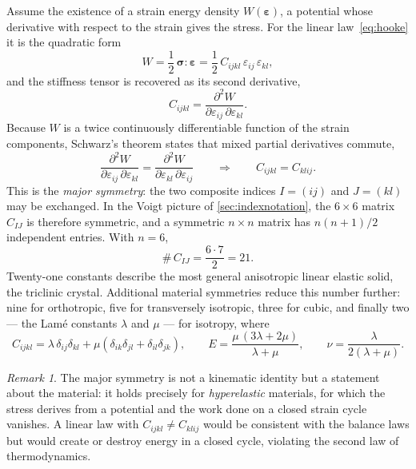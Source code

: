 \documentclass[11pt,a4paper]{article}
\numberwithin{equation}{section}
\theoremstyle{remark}
\newtheorem{remark}{Remark}[section]
\newcommand{\bsig}{\bm{\sigma}}
\newcommand{\beps}{\bm{\varepsilon}}
\begin{document}
Assume the existence of a strain energy density $W(\beps)$, a potential whose derivative
with respect to the strain gives the stress. For the linear law~\eqref{eq:hooke} it is the
quadratic form
\begin{equation}\label{eq:W}
  W = \frac{1}{2}\,\bsig:\beps = \frac{1}{2}\,C_{ijkl}\,\varepsilon_{ij}\,\varepsilon_{kl},
\end{equation}
and the stiffness tensor is recovered as its second derivative,
\begin{equation}\label{eq:Cfrom W}
  C_{ijkl} = \frac{\partial^2 W}{\partial \varepsilon_{ij}\,\partial \varepsilon_{kl}}.
\end{equation}
Because $W$ is a twice continuously differentiable function of the strain components,
Schwarz's theorem states that mixed partial derivatives commute,
\begin{equation}\label{eq:schwarz}
  \frac{\partial^2 W}{\partial \varepsilon_{ij}\,\partial \varepsilon_{kl}}
  = \frac{\partial^2 W}{\partial \varepsilon_{kl}\,\partial \varepsilon_{ij}}
  \qquad\Longrightarrow\qquad
  C_{ijkl} = C_{klij}.
\end{equation}
This is the \emph{major symmetry}: the two composite indices $I = (ij)$ and $J = (kl)$ may
be exchanged. In the Voigt picture of \cref{sec:indexnotation}, the $6\times6$ matrix
$C_{IJ}$ is therefore symmetric, and a symmetric $n\times n$ matrix has
$n(n+1)/2$ independent entries. With $n = 6$,
\begin{equation}\label{eq:21}
  \boxed{\;\#\,C_{IJ} = \frac{6\cdot 7}{2} = 21.\;}
\end{equation}
Twenty-one constants describe the most general anisotropic linear elastic solid, the
triclinic crystal. Additional material symmetries reduce this number further: nine for
orthotropic, five for transversely isotropic, three for cubic, and finally two --- the
Lam\'e constants $\lambda$ and $\mu$ --- for isotropy, where
\begin{equation}\label{eq:isotropic}
  C_{ijkl} = \lambda\,\delta_{ij}\delta_{kl} + \mu\left(\delta_{ik}\delta_{jl} + \delta_{il}\delta_{jk}\right),
  \qquad
  E = \frac{\mu\,(3\lambda + 2\mu)}{\lambda + \mu},
  \qquad
  \nu = \frac{\lambda}{2(\lambda+\mu)}.
\end{equation}

\begin{remark}
  The major symmetry is not a kinematic identity but a statement about the material: it
  holds precisely for \emph{hyperelastic} materials, for which the stress derives from a
  potential and the work done on a closed strain cycle vanishes. A linear law with
  $C_{ijkl} \neq C_{klij}$ would be consistent with the balance laws but would create or
  destroy energy in a closed cycle, violating the second law of thermodynamics.
\end{remark}
\end{document}
